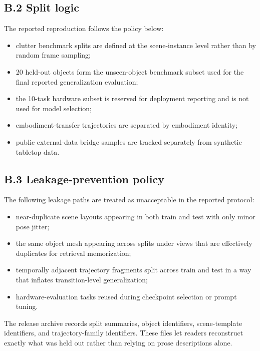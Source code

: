 \documentclass[11pt]{article}
\begin{document}
\subsection{B.2 Split logic}

The reported reproduction follows the policy below:

\begin{itemize}[leftmargin=1.5em]
\item clutter benchmark splits are defined at the scene-instance level rather than by random frame sampling;
\item 20 held-out objects form the unseen-object benchmark subset used for the final reported generalization evaluation;
\item the 10-task hardware subset is reserved for deployment reporting and is not used for model selection;
\item embodiment-transfer trajectories are separated by embodiment identity;
\item public external-data bridge samples are tracked separately from synthetic tabletop data.
\end{itemize}

\subsection{B.3 Leakage-prevention policy}

The following leakage paths are treated as unacceptable in the reported protocol:

\begin{itemize}[leftmargin=1.5em]
\item near-duplicate scene layouts appearing in both train and test with only minor pose jitter;
\item the same object mesh appearing across splits under views that are effectively duplicates for retrieval memorization;
\item temporally adjacent trajectory fragments split across train and test in a way that inflates transition-level generalization;
\item hardware-evaluation tasks reused during checkpoint selection or prompt tuning.
\end{itemize}

The release archive records split summaries, object identifiers, scene-template identifiers, and trajectory-family identifiers. These files let readers reconstruct exactly what was held out rather than relying on prose descriptions alone.
\end{document}
